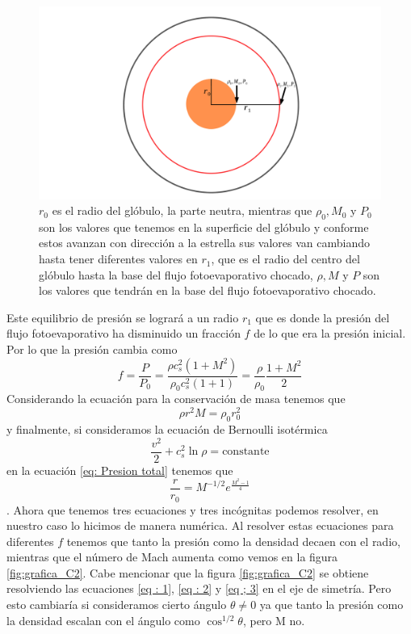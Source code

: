 \documentclass{book}
\begin{document}
\begin{figure}[htb]
    \centering \includegraphics[width=\textwidth]{artesanales/ImgFi01-3.pdf}
    \caption{$r_0$ es el radio del glóbulo, la parte neutra, mientras que $\rho_0,M_0$ y $P_0$ son los valores que tenemos en la superficie del glóbulo y conforme estos avanzan con dirección a la estrella sus valores van cambiando hasta tener diferentes valores en $r_1$, que es el radio del centro del glóbulo hasta la base del flujo fotoevaporativo chocado, $\rho,M$ y $P$ son los valores que tendrán en la base del flujo fotoevaporativo chocado.}
    \label{fig:parameters}
\end{figure}

Este equilibrio de presión se logrará a un radio $r_1$ que es donde la presión del flujo fotoevaporativo ha disminuido un fracción $f$ de lo que era la presión inicial. Por lo que la presión cambia como 
\begin{equation}\label{eq : 1}
f=\frac{P}{P_0}=\frac{\rho c_s^2(1+M^2)}{\rho_0 c_s^2(1+1)}=\frac{\rho}{\rho_0}\frac{1+M^2}{2}
\end{equation}
Considerando la ecuación para la conservación de masa tenemos que
\begin{equation}\label{eq : 2}
\rho r^2M	=\rho_0 r_0^2
\end{equation}
y finalmente, si consideramos la ecuación de Bernoulli isotérmica 
\begin{equation}
\frac{v^2}{2}+c_s^2\ln\rho=\text{constante}
\end{equation}
en la ecuación \ref{eq: Presion total} tenemos que 
\begin{equation}\label{eq ; 3} \frac{r}{r_0}=M^{-1/2}e^{\frac{M^2-1}{4}}
\end{equation}
\citep{Dyson:1968}.
Ahora que tenemos tres ecuaciones y tres incógnitas podemos resolver, en nuestro caso lo hicimos de manera numérica. Al resolver estas ecuaciones para diferentes $f$ tenemos que tanto la presión como la densidad decaen con el radio, mientras que el número de Mach aumenta como vemos en la figura \ref{fig:grafica_C2}. Cabe mencionar que la figura \ref{fig:grafica_C2} se obtiene resolviendo las ecuaciones \ref{eq : 1}, \ref{eq : 2} y \ref{eq ; 3} en el eje de simetría. Pero esto cambiaría si consideramos cierto ángulo $\theta\neq 0 $ ya que tanto la presión como la densidad escalan con el ángulo como $\cos^{1/2}\theta$, pero M no.
\end{document}
